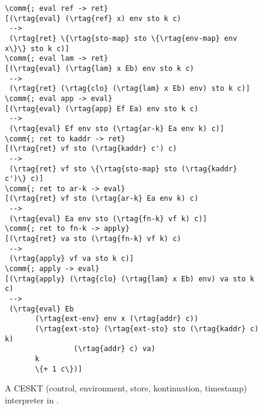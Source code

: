 \begin{wrapfigure}{r}{6.8cm}
\vspace{-0.75cm}
\begin{Verbatim}[baselinestretch=.75,commandchars=\\\{\}]
\comm{; eval ref -> ret}
[(\rtag{eval} (\rtag{ref} x) env sto k c)
 --> 
 (\rtag{ret} \{\rtag{sto-map} sto \{\rtag{env-map} env x\}\} sto k c)] 
\comm{; eval lam -> ret}
[(\rtag{eval} (\rtag{lam} x Eb) env sto k c)
 --> 
 (\rtag{ret} (\rtag{clo} (\rtag{lam} x Eb) env) sto k c)]
\comm{; eval app -> eval}
[(\rtag{eval} (\rtag{app} Ef Ea) env sto k c)
 --> 
 (\rtag{eval} Ef env sto (\rtag{ar-k} Ea env k) c)]
\comm{; ret to kaddr -> ret}
[(\rtag{ret} vf sto (\rtag{kaddr} c') c)
 -->
 (\rtag{ret} vf sto \{\rtag{sto-map} sto (\rtag{kaddr} c')\} c)]
\comm{; ret to ar-k -> eval}
[(\rtag{ret} vf sto (\rtag{ar-k} Ea env k) c)
 --> 
 (\rtag{eval} Ea env sto (\rtag{fn-k} vf k) c)]
\comm{; ret to fn-k -> apply}
[(\rtag{ret} va sto (\rtag{fn-k} vf k) c)
 --> 
 (\rtag{apply} vf va sto k c)]
\comm{; apply -> eval}
[(\rtag{apply} (\rtag{clo} (\rtag{lam} x Eb) env) va sto k c)
 --> 
 (\rtag{eval} Eb
       (\rtag{ext-env} env x (\rtag{addr} c))
       (\rtag{ext-sto} (\rtag{ext-sto} sto (\rtag{kaddr} c) k)
                (\rtag{addr} c) va)
       k
       \{+ 1 c\})]
\end{Verbatim}
\caption{A CESKT (control, environment, store, kontinuation, timestamp) interpreter in \slog{}.}
\label{fig:cesk-machine}
\vspace{-0.25cm}
\end{wrapfigure}
